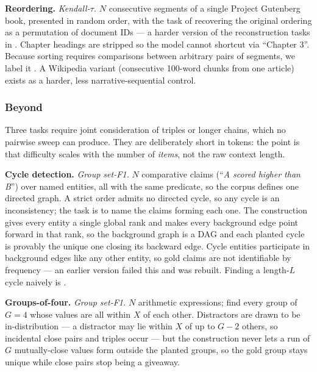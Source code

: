 \textbf{Reordering.} \emph{Kendall-$\tau$.} $N$ consecutive segments of a single Project Gutenberg book, presented in random order, with the task of recovering the original ordering as a permutation of document IDs --- a harder version of the reconstruction tasks in \citet{Chen2026LongBenchPA}. Chapter headings are stripped so the model cannot shortcut via ``Chapter 3''. Because sorting requires comparisons between arbitrary pairs of segments, we label it . A Wikipedia variant (consecutive 100-word chunks from one article) exists as a harder, less narrative-sequential control.

\subsubsection{Beyond }

Three tasks require joint consideration of triples or longer chains, which no pairwise sweep can produce. They are deliberately short in tokens: the point is that difficulty scales with the number of \emph{items}, not the raw context length.

\textbf{Cycle detection.} \emph{Group set-F1.} $N$ comparative claims (``\emph{A scored higher than B}'') over named entities, all with the same predicate, so the corpus defines one directed graph. A strict order admits no directed cycle, so any cycle is an inconsistency; the task is to name the claims forming each one. The construction gives every entity a single global rank and makes every background edge point forward in that rank, so the background graph is a DAG and each planted cycle is provably the unique one closing its backward edge. Cycle entities participate in background edges like any other entity, so gold claims are not identifiable by frequency --- an earlier version failed this and was rebuilt. Finding a length-$L$ cycle naively is .

\textbf{Groups-of-four.} \emph{Group set-F1.} $N$ arithmetic expressions; find every group of $G{=}4$ whose values are all within $X$ of each other. Distractors are drawn to be in-distribution --- a distractor may lie within $X$ of up to $G{-}2$ others, so incidental close pairs and triples occur --- but the construction never lets a run of $G$ mutually-close values form outside the planted groups, so the gold group stays unique while close pairs stop being a giveaway.


